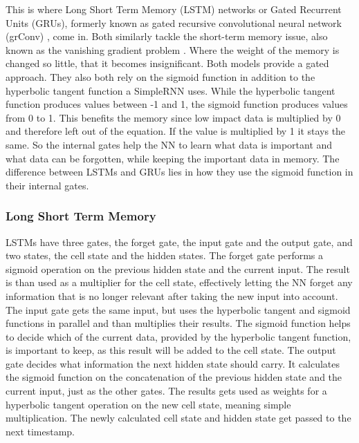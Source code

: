 \documentclass[
	ngerman,
	ruledheaders=section,%
	class=report,%
	thesis={type=bachelor},%
	accentcolor=9c,%
	custommargins=true,%
	marginpar=false,%
	parskip=half-,%
	fontsize=11pt,%
	twoside
]{tudapub}
\begin{document}
This is where Long Short Term Memory (LSTM) networks \cite{hochreiterLongShortTermMemory1997} or Gated Recurrent Units (GRUs), formerly known as gated recursive convolutional neural network (grConv) \cite{bahdanauNeuralMachineTranslation2016}, come in.
Both similarly tackle the short-term memory issue,
also known as the vanishing gradient problem \cite{hochreiterLongShortTermMemory1997}.
Where the weight of the memory is changed so little, that it becomes insignificant.
Both models provide a gated approach.
They also both rely on the sigmoid function in addition to the hyperbolic tangent function a SimpleRNN uses.
While the hyperbolic tangent function produces values between -1 and 1,
the sigmoid function produces values from 0 to 1.
This benefits the memory since low impact data is multiplied by 0 and therefore left out of the equation.
If the value is multiplied by 1 it stays the same.
So the internal gates help the NN to learn what data is important and what data can be forgotten, while keeping the important data in memory.
The difference between LSTMs and GRUs lies in how they use the sigmoid function in their internal gates.

\subsubsection{Long Short Term Memory}

LSTMs have three gates, the forget gate, the input gate and the output gate, and two states, the cell state and the hidden states. \cite{phiIllustratedGuideLSTM2020}
The forget gate performs a sigmoid operation on the previous hidden state and the current input.
The result is than used as a multiplier for the cell state, effectively letting the NN forget any information that is no longer relevant after taking the new input into account.
The input gate gets the same input, but uses the hyperbolic tangent and sigmoid functions in parallel and than multiplies their results.
The sigmoid function helps to decide which of the current data, provided by the hyperbolic tangent function, is important to keep, as this result will be added to the cell state.
The output gate decides what information the next hidden state should carry.
It calculates the sigmoid function on the concatenation of the previous hidden state and the current input, just as the other gates.
The results gets used as weights for a hyperbolic tangent operation on the new cell state, meaning simple multiplication.
The newly calculated cell state and hidden state get passed to the next timestamp.
\end{document}
